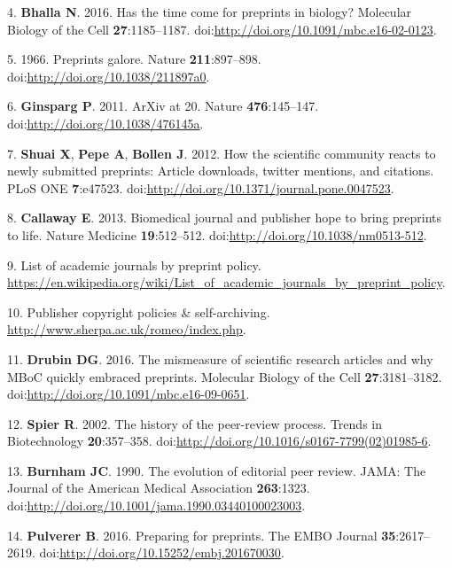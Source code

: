 \documentclass[11pt,]{article}
\begin{document}
4. \textbf{Bhalla N}. 2016. Has the time come for preprints in biology?
Molecular Biology of the Cell \textbf{27}:1185--1187.
doi:\url{http://doi.org/10.1091/mbc.e16-02-0123}.

5. 1966. Preprints galore. Nature \textbf{211}:897--898.
doi:\url{http://doi.org/10.1038/211897a0}.

6. \textbf{Ginsparg P}. 2011. ArXiv at 20. Nature \textbf{476}:145--147.
doi:\url{http://doi.org/10.1038/476145a}.

7. \textbf{Shuai X}, \textbf{Pepe A}, \textbf{Bollen J}. 2012. How the
scientific community reacts to newly submitted preprints: Article
downloads, twitter mentions, and citations. PLoS ONE \textbf{7}:e47523.
doi:\url{http://doi.org/10.1371/journal.pone.0047523}.

8. \textbf{Callaway E}. 2013. Biomedical journal and publisher hope to
bring preprints to life. Nature Medicine \textbf{19}:512--512.
doi:\url{http://doi.org/10.1038/nm0513-512}.

9. List of academic journals by preprint policy.
\url{https://en.wikipedia.org/wiki/List_of_academic_journals_by_preprint_policy}.

10. Publisher copyright policies \& self-archiving.
\url{http://www.sherpa.ac.uk/romeo/index.php}.

11. \textbf{Drubin DG}. 2016. The mismeasure of scientific research
articles and why MBoC quickly embraced preprints. Molecular Biology of
the Cell \textbf{27}:3181--3182.
doi:\url{http://doi.org/10.1091/mbc.e16-09-0651}.

12. \textbf{Spier R}. 2002. The history of the peer-review process.
Trends in Biotechnology \textbf{20}:357--358.
doi:\url{http://doi.org/10.1016/s0167-7799(02)01985-6}.

13. \textbf{Burnham JC}. 1990. The evolution of editorial peer review.
JAMA: The Journal of the American Medical Association \textbf{263}:1323.
doi:\url{http://doi.org/10.1001/jama.1990.03440100023003}.

14. \textbf{Pulverer B}. 2016. Preparing for preprints. The EMBO Journal
\textbf{35}:2617--2619.
doi:\url{http://doi.org/10.15252/embj.201670030}.
\end{document}
